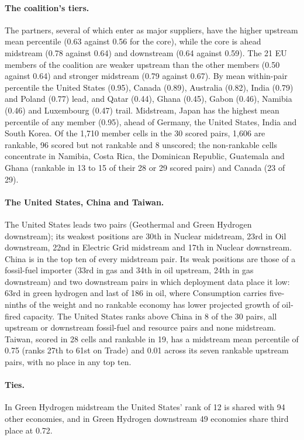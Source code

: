 \paragraph{The coalition's tiers.} The partners, several of which enter as major suppliers, have the
higher upstream mean percentile (0.63 against 0.56 for the core), while the core is ahead midstream
(0.78 against 0.64) and downstream (0.64 against 0.59). The 21 EU members of the coalition are
weaker upstream than the other members (0.50 against 0.64) and stronger midstream (0.79 against
0.67). By mean within-pair percentile the United States (0.95), Canada (0.89), Australia (0.82),
India (0.79) and Poland (0.77) lead, and Qatar (0.44), Ghana (0.45), Gabon (0.46), Namibia (0.46)
and Luxembourg (0.47) trail. Midstream, Japan has the highest mean percentile of any member (0.95),
ahead of Germany, the United States, India and South Korea. Of the 1{,}710 member cells in the 30
scored pairs, 1{,}606 are rankable, 96 scored but not rankable and 8 unscored; the non-rankable
cells concentrate in Namibia, Costa Rica, the Dominican Republic, Guatemala and Ghana (rankable in
13 to 15 of their 28 or 29 scored pairs) and Canada (23 of 29).

\paragraph{The United States, China and Taiwan.} The United States leads two pairs (Geothermal and
Green Hydrogen downstream); its weakest positions are 30th in Nuclear midstream, 23rd in Oil
downstream, 22nd in Electric Grid midstream and 17th in Nuclear downstream. China is in the top ten
of every midstream pair. Its weak positions are those of a fossil-fuel importer (33rd in gas and
34th in oil upstream, 24th in gas downstream) and two downstream pairs in which deployment data
place it low: 63rd in green hydrogen and last of 186 in oil, where Consumption carries five-ninths
of the weight and no rankable economy has lower projected growth of oil-fired capacity. The United
States ranks above China in 8 of the 30 pairs, all upstream or downstream fossil-fuel and resource
pairs and none midstream. Taiwan, scored in 28 cells and rankable in 19, has a midstream mean
percentile of 0.75 (ranks 27th to 61st on Trade) and 0.01 across its seven rankable upstream pairs,
with no place in any top ten.

\paragraph{Ties.} In Green Hydrogen midstream the United States' rank of 12 is shared with 94 other
economies, and in Green Hydrogen downstream 49 economies share third place at 0.72.
